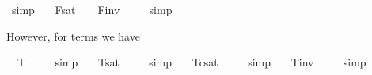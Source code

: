 \begin{isabellebody}
\ simp\ \isamarkupfalse%
%
\endisatagproof
{\isafoldproof}%
%
\isadelimproof
%
\endisadelimproof
\isanewline
{}\isamarkupfalse%
\ \ {\isachardoublequoteopen}{\isacharbrackleft}{\isasymphi}\isactrlsup F{\isacharbrackright}\isactrlsup s\isactrlsup a\isactrlsup t\ {\isacharequal}\ {\isasymtop}\ {\isasymlongleftrightarrow}\ {\isacharbrackleft}{\isasymphi}\isactrlsup F{\isacharbrackright}\isactrlsup i\isactrlsup n\isactrlsup v\ {\isacharequal}\ {\isasymbottom}{\isachardoublequoteclose}%
\isadelimproof
\ %
\endisadelimproof
%
\isatagproof
{}\isamarkupfalse%
\ simp\ \isamarkupfalse%
%
\endisatagproof
{\isafoldproof}%
%
\isadelimproof
%
\endisadelimproof
%
\begin{isamarkuptext}%
However, for terms we have%
\end{isamarkuptext}%
\isamarkuptrue%
\isamarkupfalse%
\ \ {\isachardoublequoteopen}{\isacharbrackleft}{\isasymphi}\isactrlsup T{\isacharbrackright}\ {\isacharequal}\ {\isacharasterisk}{\isachardoublequoteclose}%
\isadelimproof
\ %
\endisadelimproof
%
\isatagproof
{}\isamarkupfalse%
\ simp\ \isamarkupfalse%
%
\endisatagproof
{\isafoldproof}%
%
\isadelimproof
%
\endisadelimproof
\isanewline
{}\isamarkupfalse%
\ \ {\isachardoublequoteopen}{\isacharbrackleft}{\isasymphi}\isactrlsup T{\isacharbrackright}\isactrlsup s\isactrlsup a\isactrlsup t\ {\isacharequal}\ {\isacharasterisk}{\isachardoublequoteclose}%
\isadelimproof
\ %
\endisadelimproof
%
\isatagproof
{}\isamarkupfalse%
\ simp\ \isamarkupfalse%
%
\endisatagproof
{\isafoldproof}%
%
\isadelimproof
%
\endisadelimproof
\isanewline
{}\isamarkupfalse%
\ \ {\isachardoublequoteopen}{\isacharbrackleft}{\isasymphi}\isactrlsup T{\isacharbrackright}\isactrlsup c\isactrlsup s\isactrlsup a\isactrlsup t\ {\isacharequal}\ {\isacharasterisk}{\isachardoublequoteclose}%
\isadelimproof
\ %
\endisadelimproof
%
\isatagproof
{}\isamarkupfalse%
\ simp\ \isamarkupfalse%
%
\endisatagproof
{\isafoldproof}%
%
\isadelimproof
%
\endisadelimproof
\isanewline
{}\isamarkupfalse%
\ \ {\isachardoublequoteopen}{\isacharbrackleft}{\isasymphi}\isactrlsup T{\isacharbrackright}\isactrlsup i\isactrlsup n\isactrlsup v\ {\isacharequal}\ {\isacharasterisk}{\isachardoublequoteclose}%
\isadelimproof
\ %
\endisadelimproof
%
\isatagproof
{}\isamarkupfalse%
\ simp\ \isamarkupfalse%
%
\endisatagproof
{\isafoldproof}%
%
\isadelimproof

\end{isabellebody}
